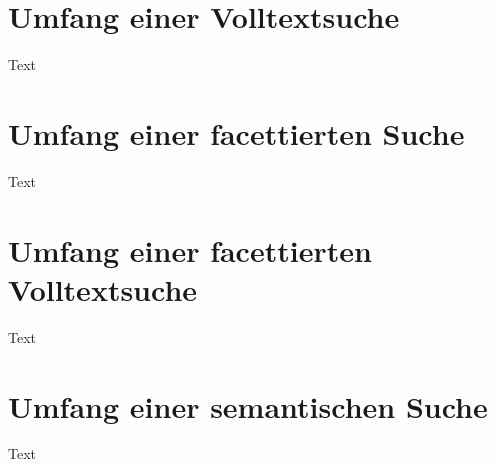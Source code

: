 

\section{Umfang einer Volltextsuche\label{sec3.2:Unterunterpunkt-2}}

Text

\section{Umfang einer facettierten Suche\label{sec3.3:Unterpunkt-3}}

Text

\section{Umfang einer facettierten Volltextsuche\label{sec3.4:Unterpunkt-4}}

Text

\section{Umfang einer semantischen Suche\label{sec3.5:Unterpunkt-5}}

Text